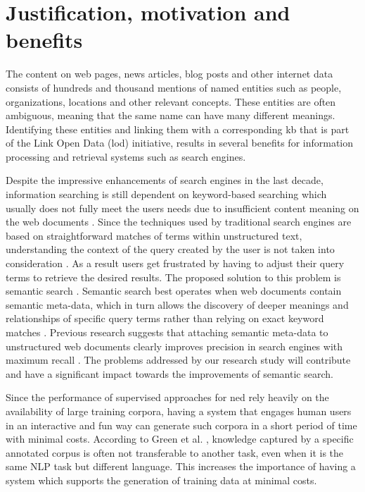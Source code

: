 \section{Justification, motivation and benefits}

The content on web pages, news articles, blog posts and other internet data consists of hundreds and thousand mentions of named entities such as people, organizations, locations and other relevant concepts. These entities are often ambiguous, meaning that the same name can have many different meanings. Identifying these entities and linking them with a corresponding \ac{kb} that is part of the Link Open Data (\ac{lod}) initiative, results in several benefits for information processing and retrieval systems such as search engines. 

Despite the impressive enhancements of search engines in the last decade, information searching is still dependent on keyword-based searching which usually does not fully meet the users needs due to insufficient content meaning on the web documents \cite{5}. Since the techniques used by traditional search engines are based on straightforward matches of terms within unstructured text, understanding the context of the query created by the user is not taken into consideration \cite{18}. As a result users get frustrated by having to adjust their query terms to retrieve the desired results. The proposed solution to this problem is semantic search \cite{semantic_search}. Semantic search best operates when web documents contain semantic meta-data, which in turn allows the discovery of deeper meanings and relationships of specific query terms rather than relying on exact keyword matches \cite{18}. Previous research suggests that attaching semantic meta-data to unstructured web documents clearly improves precision in search engines with maximum recall \cite{18}. The problems addressed by our research study will contribute and have a significant impact towards the improvements of semantic search.

Since the performance of supervised approaches for \ac{ned} rely heavily on the availability of large training corpora, having a system that engages human users in an interactive and fun way can generate such corpora in a short period of time with minimal costs. According to Green et al. \cite{50}, knowledge captured by a specific annotated corpus is often not transferable to another task, even when it is the same NLP task but different language. This increases the importance of having a system which supports the generation of training data at minimal costs. 

